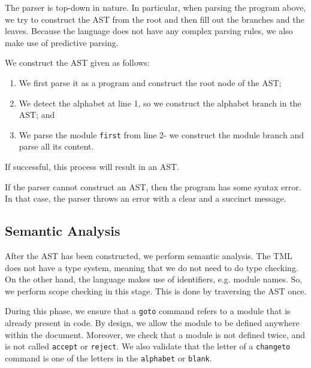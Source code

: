 The parser is top-down in nature. In particular, when parsing the program above, we try to construct the AST from the root and then fill out the branches and the leaves. Because the language does not have any complex parsing rules, we also make use of predictive parsing.

We construct the AST given as follows:
\begin{enumerate}
    \item We first parse it as a program and construct the root node of the AST;
    \item We detect the alphabet at line 1, so we construct the alphabet branch in the AST; and 
    \item We parse the module \texttt{first} from line 2- we construct the module branch and parse all its content.
\end{enumerate}
If successful, this process will result in an AST.

If the parser cannot construct an AST, then the program has some syntax error. In that case, the parser throws an error with a clear and a succinct message.

\subsection{Semantic Analysis}
After the AST has been constructed, we perform semantic analysis. The TML does not have a type system, meaning that we do not need to do type checking. On the other hand, the language makes use of identifiers, e.g. module names. So, we perform scope checking in this stage. This is done by traversing the AST once.



During this phase, we ensure that a \texttt{goto} command refers to a module that is already present in code. By design, we allow the module to be defined anywhere within the document. Moreover, we check that a module is not defined twice, and is not called \texttt{accept} or \texttt{reject}. We also validate that the letter of a \texttt{changeto} command is one of the letters in the \texttt{alphabet} or \texttt{blank}. 


